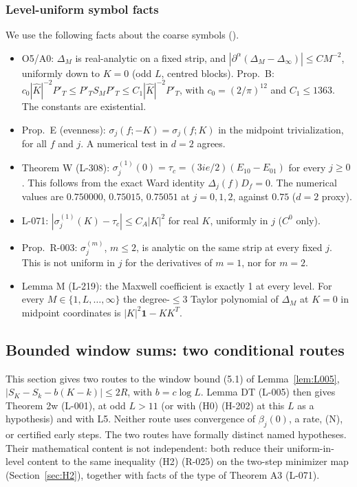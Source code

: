 \subsubsection{Level-uniform symbol facts}\label{sec:symbols}
We use the following facts about the coarse symbols ().
\begin{itemize}
\item O5/A0: $\Delta_M$ is real-analytic on a fixed strip, and $|\partial^\alpha(\Delta_M-\Delta_\infty)|\le CM^{-2}$, uniformly down to $K=0$ (odd $L$, centred blocks). Prop.\ B: $c_0|\hat K|^{-2}P'_T\le P'_TS_MP'_T\le C_1|\hat K|^{-2}P'_T$, with $c_0=(2/\pi)^{12}$ and $C_1\le1363$. The constants are existential.
\item Prop.\ E (evenness): $\sigma_j(f;-K)=\sigma_j(f;K)$ in the midpoint trivialization, for all $f$ and $j$. A numerical test in $d=2$ agrees.
\item Theorem W (L-308): $\sigma_j^{(1)}(0)=\tau_c=(3ie/2)(E_{10}-E_{01})$ for every $j\ge0$. This follows from the exact Ward identity $\Delta_j(f)D_f=0$. The numerical values are $0.750000$, $0.75015$, $0.75051$ at $j=0,1,2$, against $0.75$ ($d=2$ proxy).
\item L-071: $|\sigma_j^{(1)}(K)-\tau_c|\le C_A|K|^2$ for real $K$, uniformly in $j$ ($C^0$ only).
\item Prop.\ R-003: $\sigma_j^{(m)}$, $m\le2$, is analytic on the same strip at every fixed $j$. This is not uniform in $j$ for the derivatives of $m=1$, nor for $m=2$.
\item Lemma M (L-219): the Maxwell coefficient is exactly 1 at every level. For every $M\in\{1,L,\dots,\infty\}$ the degree-$\le3$ Taylor polynomial of $\Delta_M$ at $K=0$ in midpoint coordinates is $|K|^2\mathbf 1-KK^T$.
\end{itemize}

\subsection{Bounded window sums: two conditional routes}\label{sec:routes}

This section gives two routes to the window bound (5.1) of Lemma~\ref{lem:L005}, $|S_K-S_k-b(K-k)|\le 2R$, with $b=c\log L$. Lemma DT (L-005) then gives Theorem 2w (L-001), at odd $L>11$ (or with (H0) (H-202) at this $L$ as a hypothesis) and with L5. Neither route uses convergence of $\beta_j(0)$, a rate, (N), or certified early steps. The two routes have formally distinct named hypotheses. Their mathematical content is not independent: both reduce their uniform-in-level content to the same inequality (H2) (R-025) on the two-step minimizer map (Section~\ref{sec:H2}), together with facts of the type of Theorem A3 (L-071).

